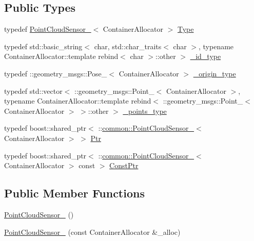 \subsection*{Public Types}
\begin{DoxyCompactItemize}
\item 
typedef \hyperlink{structcommon_1_1PointCloudSensor__}{Point\+Cloud\+Sensor\+\_\+}$<$ Container\+Allocator $>$ \hyperlink{structcommon_1_1PointCloudSensor___a2d51d94fad4cb80d107e478a2c209623}{Type}
\item 
typedef std\+::basic\+\_\+string$<$ char, std\+::char\+\_\+traits$<$ char $>$, typename Container\+Allocator\+::template rebind$<$ char $>$\+::other $>$ \hyperlink{structcommon_1_1PointCloudSensor___a3fe5231127bdd91f0f9cc71c2b0c8bb9}{\+\_\+id\+\_\+type}
\item 
typedef \+::geometry\+\_\+msgs\+::\+Pose\+\_\+$<$ Container\+Allocator $>$ \hyperlink{structcommon_1_1PointCloudSensor___a68f3e06b319324c54ccf6930c76ce5a5}{\+\_\+origin\+\_\+type}
\item 
typedef std\+::vector$<$ \+::geometry\+\_\+msgs\+::\+Point\+\_\+$<$ Container\+Allocator $>$, typename Container\+Allocator\+::template rebind$<$ \+::geometry\+\_\+msgs\+::\+Point\+\_\+$<$ Container\+Allocator $>$ $>$\+::other $>$ \hyperlink{structcommon_1_1PointCloudSensor___ad2bc50eca8da26178a900f86334007b5}{\+\_\+points\+\_\+type}
\item 
typedef boost\+::shared\+\_\+ptr$<$ \+::\hyperlink{structcommon_1_1PointCloudSensor__}{common\+::\+Point\+Cloud\+Sensor\+\_\+}$<$ Container\+Allocator $>$ $>$ \hyperlink{structcommon_1_1PointCloudSensor___a7cbc6d865b866238a2f0005b949dc35c}{Ptr}
\item 
typedef boost\+::shared\+\_\+ptr$<$ \+::\hyperlink{structcommon_1_1PointCloudSensor__}{common\+::\+Point\+Cloud\+Sensor\+\_\+}$<$ Container\+Allocator $>$ const  $>$ \hyperlink{structcommon_1_1PointCloudSensor___a117bed0d1fee46f191b44bc8563bd10c}{Const\+Ptr}
\end{DoxyCompactItemize}
\subsection*{Public Member Functions}
\begin{DoxyCompactItemize}
\item 
\hyperlink{structcommon_1_1PointCloudSensor___af154d28b9da46c67ba6de075d22a5f34}{Point\+Cloud\+Sensor\+\_\+} ()
\item 
\hyperlink{structcommon_1_1PointCloudSensor___a2857de8ba28bbb8b22394120412690f0}{Point\+Cloud\+Sensor\+\_\+} (const Container\+Allocator \&\+\_\+alloc)
\end{DoxyCompactItemize}
